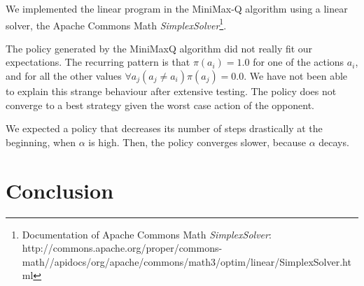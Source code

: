 \documentclass{article}
\begin{document}
We implemented the linear program in the MiniMax-Q algorithm using a linear solver, the Apache Commons Math \emph{SimplexSolver}\footnote{Documentation of Apache Commons Math \emph{SimplexSolver}: http://commons.apache.org/proper/commons-math//apidocs/org/apache/commons/math3/optim/linear/SimplexSolver.html}.

The policy generated by the MiniMaxQ algorithm did not really fit our expectations. The recurring pattern is that $\pi(a_i) = 1.0$ for one of the actions $a_i$, and for all the other values $\forall a_j (a_j \neq a_i) \pi(a_j) = 0.0$. We have not been able to explain this strange behaviour after extensive testing. The policy does not converge to a best strategy given the worst case action of the opponent.

We expected a policy that decreases its number of steps drastically at the beginning, when $\alpha$ is high. Then, the policy converges slower, because $\alpha$ decays. %
\section{Conclusion}
\end{document}
